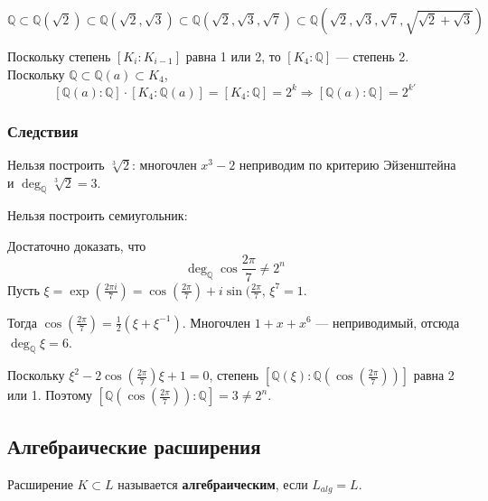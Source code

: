 \documentclass[a4paper]{article}
\newcommand{\Q}{\ensuremath{\mathbb{Q}}}
\numberwithin{theorem}{section}
\numberwithin{lemma}{section}
\numberwithin{proposition}{section}
\numberwithin{corollary}{section}
\begin{document}
\[\Q \subset \Q(\sqrt{2}) \subset \Q(\sqrt{2},\sqrt{3})
\subset \Q(\sqrt{2},\sqrt{3},\sqrt{7})
\subset \Q(\sqrt{2},\sqrt{3},\sqrt{7}, \sqrt{\sqrt{2}+\sqrt{3}})\]

Поскольку степень $[K_i : K_{i - 1}]$ равна 1 или 2, то $[K_4 : \Q]$ --- степень 2.
Поскольку $\Q \subset \Q(a) \subset K_4$,
\[[\Q(a) : \Q] \cdot [K_4 : \Q(a)] = [K_4 : \Q] = 2^k
\Rightarrow [\Q(a) : \Q] = 2^{k'}\]

\subsubsection*{Следствия}
Нельзя построить $\sqrt[3]{2}$: многочлен $x^3 - 2$ неприводим по критерию Эйзенштейна и $\deg_\Q \sqrt[3]{2} = 3$.

Нельзя построить семиугольник:

\begin{minipage}{0.35\linewidth}
\centering
{}
\end{minipage}
\begin{minipage}{0.6\linewidth}
Достаточно доказать, что \[\deg_\Q \cos \frac{2\pi}{7} \ne 2^n \]
Пусть $\xi = \exp(\frac{2\pi i}{7}) = \cos(\frac{2\pi}{7}) + i \sin(\frac{2\pi}{7}$, $\xi^7=1$.

Тогда $\cos(\frac{2\pi}{7}) = \frac{1}{2}(\xi + \xi^{-1})$. Многочлен $1+x+x^6$ --- неприводимый, отсюда $\deg_\Q \xi = 6$.

Поскольку $\xi^2 - 2 \cos (\frac{2\pi}{7})\xi + 1 = 0$, степень
$[\Q(\xi) : \Q(\cos (\frac{2\pi}{7}))]$ равна 2 или 1.
Поэтому $[\Q(\cos (\frac{2\pi}{7})) : \Q] = 3 \ne 2^n$.
\end{minipage}

\subsection*{Алгебраические расширения}
Расширение $K \subset L$ называется \textbf{алгебраическим},
если $L_{alg} = L$.
\end{document}
